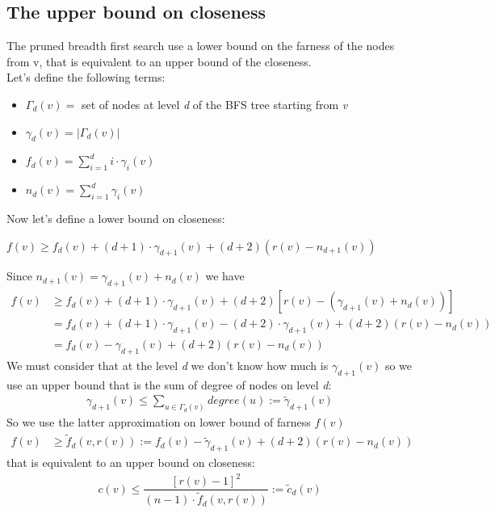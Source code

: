   \subsection{The upper bound on closeness}
 The pruned breadth first search use a lower bound on the farness of the nodes from v, that is equivalent to an upper bound of the closeness.\\
 Let's define the following terms:
 \begin{itemize}
 	\item $ \Gamma_d(v) = $ set of nodes at level \textit{d} of the BFS tree starting from \textit{v}
 	\item $ \gamma_d(v) = |\Gamma_d(v)| $
 	\item $ f_d(v) = \sum_{i=1}^{d} i \cdot \gamma_i(v) $
 	\item $ n_d(v) = \sum_{i=1}^{d} \gamma_i(v) $
\end{itemize}
Now let's define a lower bound on closeness:
\begin{center}
	$ f(v) \geq f_d(v) + (d+1) \cdot  \gamma_{d+1}(v) + (d+2)(r(v) - n_{d+1}(v))$
\end{center}
Since $ n_{d+1}(v) = \gamma_{d+1}(v) + n_d(v) $ we have
\begin{align*}
	 f(v) &\geq f_d(v) + (d+1) \cdot \gamma_{d+1}(v) + (d+2)\left[r(v) - (\gamma_{d+1}(v) + n_d(v))\right] \\
	 &= f_d(v) + (d+1) \cdot \gamma_{d+1}(v) - (d+2) \cdot \gamma_{d+1}(v) + (d+2)(r(v) - n_d(v)) \\
	 &= f_d(v)   - \gamma_{d+1}(v) + (d+2)(r(v) - n_d(v)) 
\end{align*}
We must consider that at the level \textit{d} we don't know how much is $ \gamma_{d+1}(v) $ so we use an upper bound that is the sum of degree of nodes on level \textit{d}:
\begin{align*}
	\gamma_{d+1}(v) \leq \sum_{u \in \Gamma_d(v)} degree(u) := \tilde{\gamma}_{d+1}(v)
\end{align*}
So we use the latter approximation on lower bound of farness $ f(v) $ 
\begin{align*}
	 f(v) &\geq \tilde{f}_d(v, r(v)) :=  f_d(v)   - \tilde{\gamma}_{d+1}(v) + (d+2)(r(v) - n_d(v))
\end{align*}
that is equivalent to an upper bound on closeness:
\begin{align*}
	c(v) \leq \dfrac{\left[r(v) - 1 \right]^2}{(n-1) \cdot  \tilde{f}_d(v, r(v)) } := \tilde{c}_d(v) 
\end{align*}
